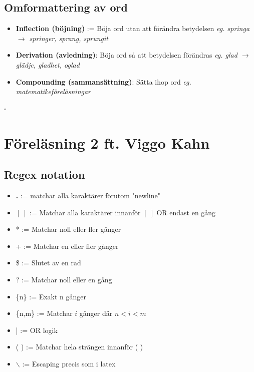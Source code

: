 \documentclass[12pt,a4paper]{article}
\begin{document}
\noindent\hrulefill

\subsection*{Omformattering av ord}
\begin{itemize}
    \item \textbf{Inflection (böjning)} := Böja ord utan att förändra betydelsen \textit{eg. springa $\rightarrow$ springer, sprang, sprungit}
    \item \textbf{Derivation (avledning)}: Böja ord så att betydelsen förändras \textit{eg. glad $\rightarrow$ glädje, gladhet, oglad}
    \item \textbf{Compounding (sammansättning)}: Sätta ihop ord \textit{eg. matematikeföreläsningar}
\end{itemize}

\noindent\hrulefill
\newline
\newline
{\Huge $\square$}

\newpage

\section*{Föreläsning 2 ft. Viggo Kahn}
\subsection*{Regex notation}
\begin{itemize}
    \item \textbf{.} := matchar alla karaktärer förutom "newline"
    \item $[\;]$ := Matchar alla karaktärer innanför $[\;]$ OR endast en gång
    \item * := Matchar noll eller fler gånger
    \item + := Matchar en eller fler gånger
    \item \$ := Slutet av en rad
    \item ? := Matchar noll eller en gång
    \item \{n\} := Exakt n gånger
    \item \{n,m\} := Matchar $i$ gånger där $n < i < m$
    \item | := OR logik
    \item ( ) := Matchar hela strängen innanför ( )
    \item $\backslash$ := Escaping precis som i latex
    
\end{itemize}
\end{document}
